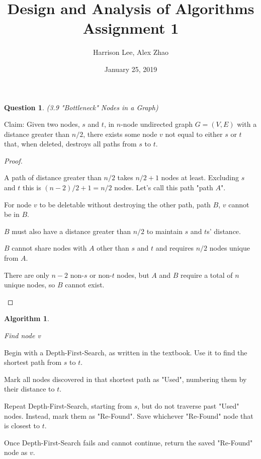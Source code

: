 \documentclass[11pt, oneside]{article}   	%
\title {Design and Analysis of Algorithms Assignment 1}
\author{Harrison Lee, Alex Zhao}
\date{January 25, 2019}
\newtheorem{Question}{Question}
\newtheorem{Algorithm}{Algorithm}
\begin{document}
\maketitle

\begin{Question} (3.9 "Bottleneck" Nodes in a Graph)
\end{Question}

Claim: Given two nodes, $s$ and $t$, in $n$-node undirected graph $G = (V, E)$ with a distance greater than $n/2$, there exists some node $v$ not equal to either $s$ or $t$ that, when deleted, destroys all paths from $s$ to $t$.

\begin{proof}
\begin{description}

A path of distance greater than $n/2$ takes $n/2 + 1$ nodes at least. Excluding $s$ and $t$ this is $(n-2)/2 + 1= n/2$ nodes. Let's call this path "path $A$".

For node $v$ to be deletable without destroying the other path, path $B$, $v$ cannot be in $B$.

$B$ must also have a distance greater than $n/2$ to maintain $s$ and $t$s' distance.

$B$ cannot share nodes with $A$ other than $s$ and $t$ and requires $n/2$ nodes unique from $A$.

There are only $n-2$ non-$s$ or non-$t$ nodes, but $A$ and $B$ require a total of $n$ unique nodes, so $B$ cannot exist.

\end{description}
\end{proof}

\begin{Algorithm}
\begin{description}
Find node v
\end{description}
\end{Algorithm}

Begin with a Depth-First-Search, as written in the textbook. Use it to find the shortest path from $s$ to $t$.

Mark all nodes discovered in that shortest path as "Used", numbering them by their distance to $t$.

Repeat Depth-First-Search, starting from $s$, but do not traverse past "Used" nodes. Instead, mark them as "Re-Found". Save whichever "Re-Found" node that is closest to $t$.

Once Depth-First-Search fails and cannot continue, return the saved "Re-Found" node as $v$.
\end{document}
